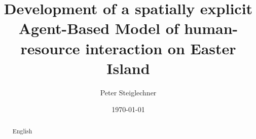 \documentclass{kththesis}
\title{Development of a spatially explicit Agent-Based Model of human-resource interaction on Easter Island}
\author{Peter Steiglechner}
\date{\today}
\begin{document}
\frontmatter
%
\titlepage

\begin{abstract}
	English
\end{abstract}
\begin{otherlanguage}{swedish}
\end{otherlanguage}

\tableofcontents

\mainmatter
%










\printbibliography[heading=bibintoc]

\appendix


\tailmatter
\end{document}
